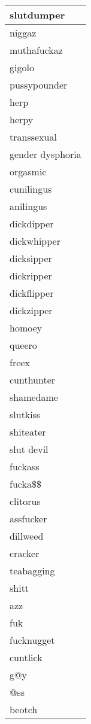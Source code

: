 \begin{longtable}{|l|}
slutdumper \\ \hline 
niggaz \\ \hline 
muthafuckaz \\ \hline 
gigolo \\ \hline 
pussypounder \\ \hline 
herp \\ \hline 
herpy \\ \hline 
transsexual \\ \hline 
gender dysphoria \\ \hline 
orgasmic \\ \hline 
cunilingus \\ \hline 
anilingus \\ \hline 
dickdipper \\ \hline 
dickwhipper \\ \hline 
dicksipper \\ \hline 
dickripper \\ \hline 
dickflipper \\ \hline 
dickzipper \\ \hline 
homoey \\ \hline 
queero \\ \hline 
freex \\ \hline 
cunthunter \\ \hline 
shamedame \\ \hline 
slutkiss \\ \hline 
shiteater \\ \hline 
slut devil \\ \hline 
fuckass \\ \hline 
fucka\$\$ \\ \hline 
clitorus \\ \hline 
assfucker \\ \hline 
dillweed \\ \hline 
cracker \\ \hline 
teabagging \\ \hline 
shitt \\ \hline 
azz \\ \hline 
fuk \\ \hline 
fucknugget \\ \hline 
cuntlick \\ \hline 
g@y \\ \hline 
@ss \\ \hline 
beotch \\ \hline 
 \end{longtable}

